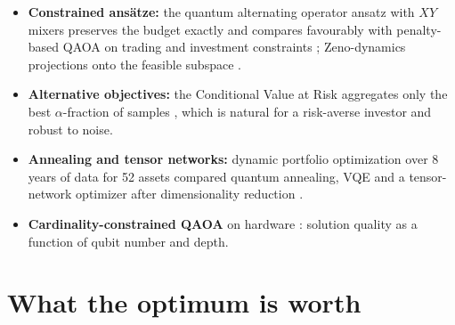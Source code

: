\documentclass[handoutsbeamer.tex]{subfiles}
\begin{document}
\begin{frame}
\begin{itemize}\setlength\itemsep{0.25em}
    \item \textbf{Constrained ansätze:} the quantum alternating operator ansatz with $XY$ mixers preserves the budget exactly and compares favourably with penalty-based QAOA on trading and investment constraints \citep{Hodson2019}; Zeno-dynamics projections onto the feasible subspace \citep{herman23}.
    \item \textbf{Alternative objectives:} the Conditional Value at Risk aggregates only the best $\alpha$-fraction of samples \citep{Barkoutsos2020}, which is natural for a risk-averse investor and robust to noise.
    \item \textbf{Annealing and tensor networks:} dynamic portfolio optimization over 8 years of data for 52 assets compared quantum annealing, VQE and a tensor-network optimizer after dimensionality reduction \citep{mugel22}.
    \item \textbf{Cardinality-constrained QAOA} on hardware \citep{Brandhofer2023}: solution quality as a function of qubit number and depth.
\end{itemize}
\end{frame}

\section{What the optimum is worth}
\end{document}
